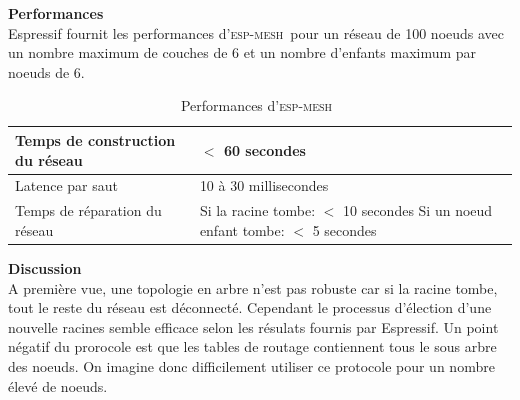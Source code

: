 \documentclass[a4paper, 12pt]{report}
\newcommand{\espmesh}{\textsc{esp-mesh}}
\begin{document}
        \vspace{0.5cm}
        \textbf{Performances}\\
            Espressif fournit les performances d'\espmesh\ pour un réseau de 100 noeuds avec un nombre maximum de couches de 6 et un nombre d'enfants maximum par noeuds de 6.

            \begin{table}[H]
                \begin{tabular}{|l|l|}
                    \hline
                    Temps de construction du réseau & $<$ 60 secondes\\ \hline
                    Latence par saut & 10 à 30 millisecondes\\ \hline
                    Temps de réparation du réseau & \makecell{Si la racine tombe: $<$ 10 secondes \\ Si un noeud enfant tombe: $<$ 5 secondes}\\ \hline
                \end{tabular}
                \caption{Performances d'\espmesh\ \cite{ESP-MESH}}
            \end{table}

            
        \textbf{Discussion}\\
            A première vue, une topologie en arbre n'est pas robuste car si la racine tombe,
            tout le reste du réseau est déconnecté. Cependant le processus d'élection
            d'une nouvelle racines semble efficace selon les résulats fournis par Espressif.
            Un point négatif du prorocole est que les tables de routage contiennent tous le sous arbre des noeuds.
            On imagine donc difficilement utiliser ce protocole pour un nombre élevé de noeuds.


    

    
\end{document}
